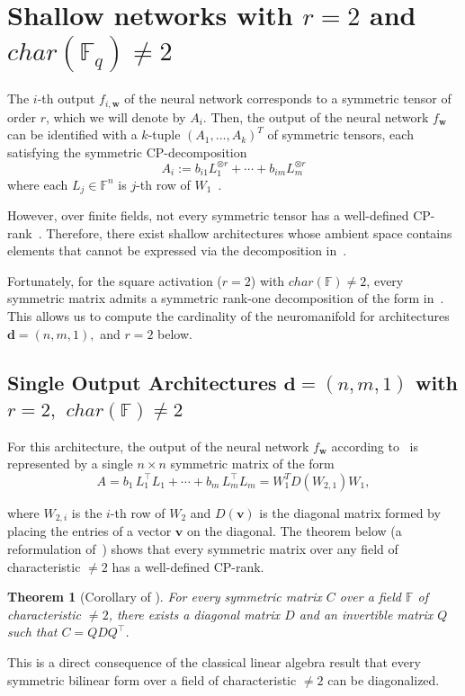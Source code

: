 \documentclass[a4paper]{cas-sc}
\newcommand{\ww}{\mathbf{w}}    %
\newcommand{\dd}{\mathbf{d}}    %
\newcommand{\F}{\mathbb{F}}
\newtheorem{theorem}{Theorem}[section]
\begin{document}
\section{Shallow networks with $r=2$ and $char(\F_q)\neq 2$}
\label{sec:shallow-r=2-p!=2}
    The $i$-th output $f_{i,\ww}$ of the neural network corresponds to a symmetric tensor of order $r$, which we will denote by $A_i$. Then, the output of the neural network $f_{\ww}$ can be identified with a $k$-tuple $(A_1, ..., A_k)^T$ of symmetric tensors, each satisfying the symmetric CP-decomposition
    \begin{equation}
    \label{eq: nmk architecture any r}
        A_i := b_{i1} L_1^{\otimes r} + \cdots + b_{im} L_m^{\otimes r}        
    \end{equation}
    where each $L_j \in \mathbb{F}^n$ is $j$-th row of $W_1$~\citep{LANDSBERG10}. 

    

    However, over finite fields, not every symmetric tensor has a well-defined CP-rank~\citep[Proposition~7.1]{FRIEDLAND13}. Therefore, there exist shallow architectures whose ambient space contains elements that cannot be expressed via the decomposition in~. 

    Fortunately, for the square activation ($r=2$) with $char(\F)\neq 2$, every symmetric matrix admits a symmetric rank-one decomposition of the form in~. This allows us to compute the cardinality of the neuromanifold for architectures $\dd=(n,m,1),$ and $r=2$ below.

\subsection{Single Output Architectures $\dd=(n,m,1)$ with $r=2,$ $char(\F)\neq 2$}
    For this architecture, the output of the neural network $f_{\ww}$ according to~ is represented by a single $n \times n$ symmetric matrix of the form
    \begin{equation}
    \label{eq: simultaneous diagonalization formulation}
        A = b_1\, L_1^\top L_1 + \cdots + b_m\, L_m^\top L_m = W_1^TD(W_{2,1})W_1,
    \end{equation}

    where $W_{2,i}$ is the $i$-th row of $W_2$ and $D(\mathbf{v})$ is the diagonal matrix formed by placing the entries of a vector $\mathbf{v}$ on the diagonal. The theorem below (a reformulation of~\citet[Theorem~9.13]{AXLER15}) shows that every symmetric matrix over any field of characteristic $\neq 2$ has a well-defined CP-rank.
    \begin{theorem} [Corollary of {\citet[Theorem~9.13]{AXLER15}}] \label{thm: sym matrices diagonalizable by congruence}
    For every symmetric matrix $C$ over a field $\F$ of characteristic $\neq 2$, there exists a diagonal matrix $D$ and an invertible matrix $Q$ such that $C = Q D Q^\top$.
    \end{theorem}
    This is a direct consequence of the classical linear algebra result that every symmetric bilinear form over a field of characteristic $\neq 2$ can be diagonalized. 
    
\end{document}
